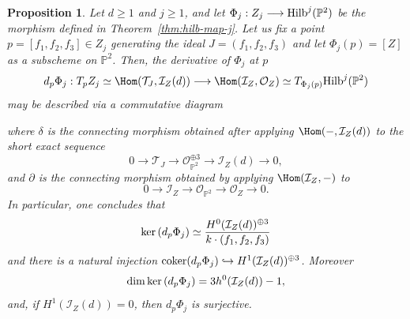 \documentclass[11pt]{amsart} %
\newcommand{\lar}{\longrightarrow}
\newtheorem{Proposition}[Theorem]{Proposition}
\theoremstyle{definition}
\def\ker{{\rm ker}\,}
\def\coker{\mbox{\rm coker}}
\def\Ext#1#2#3#4{{\rm Ext}\,^{#1}_{#2}({#3},{#4})}
\def\T{{\mathcal T}}
\def\Hilbert{{\rm Hilb}}
\begin{document}
\begin{Proposition}\label{prop:differential-Hilb-j}
Let $d \geq 1$ and $j \geq 1$, and let $\Phi_j : Z_j \lar \Hilbert^j(\mathbb{P}^2)$ be the morphism defined in Theorem~\ref{thm:hilb-map-j}. Let us fix a point $p = [f_1, f_2, f_3] \in Z_j$ generating the ideal $J = (f_1, f_2, f_3)$ and let $\Phi_j(p) = [Z]$ as a subscheme on $\mathbb{P}^2$. Then, the derivative of $\Phi_j$ at $p$
$$
d_{p}\Phi_j : T_p Z_j \simeq \Hom(\T_J, \mathcal{I}_Z(d)) \lar \Hom(\mathcal{I}_Z, \mathcal{O}_Z) \simeq T_{\Phi_j(p)}\Hilbert^j(\mathbb{P}^2)
$$
may be described via a commutative diagram 
\begin{center}
\end{center}
where $\delta$ is the connecting morphism obtained after applying $\Hom(-, \mathcal{I}_Z(d))$ to the short exact sequence
$$
0 \lar \T_J \lar \mathcal{O}_{\mathbb{P}^2}^{\oplus 3} \lar \mathcal{I}_Z(d) \lar 0,
$$
and $\partial$ is the connecting morphism obtained by applying $\Hom(\mathcal{I}_Z,-)$ to 
$$
0 \lar \mathcal{I}_Z \lar \mathcal{O}_{\mathbb{P}^2} \lar \mathcal{O}_Z \lar 0.
$$
In particular, one concludes that
\[
\ker(d_p\Phi_j)
\simeq
\frac{H^0(\mathcal I_Z(d))^{\oplus3}}
{k\cdot(f_1,f_2,f_3)}
\]
and there is a natural injection \(
\coker(d_p\Phi_j)
\hookrightarrow
H^1(\mathcal I_Z(d))^{\oplus3}\). Moreover
\[
\dim\ker(d_p\Phi_j)
=
3h^0(\mathcal I_Z(d))-1,
\]
and, if \(
H^1(\mathcal I_Z(d))=0\), then $d_p\Phi_j$ is surjective.
\end{Proposition}
\end{document}
